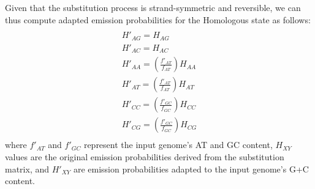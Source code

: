Given that the substitution process is
strand-symmetric and reversible, we can thus compute adapted
emission probabilities for the Homologous state as follows:
\begin{multline}\\
H'_{AG}=H_{AG}\\
H'_{AC}=H_{AC}\\
H'_{AA}=(\frac{f'_{AT}}{f_{AT}})H_{AA}\\
H'_{AT}=(\frac{f'_{AT}}{f_{AT}})H_{AT}\\
H'_{CC}=(\frac{f'_{GC}}{f_{GC}})H_{CC}\\
H'_{CG}=(\frac{f'_{GC}}{f_{GC}})H_{CG}\\
\end{multline}
where $f'_{AT}$ and $f'_{GC}$ represent the input genome's AT and GC content,
$H_{XY}$ values are the original emission probabilities derived from the
substitution matrix, and $H'_{XY}$ are emission probabilities adapted to
the input genome's G+C content.


